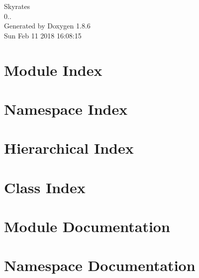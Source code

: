 \documentclass[twoside]{book}
\newcommand{\clearemptydoublepage}{%
  \newpage{\pagestyle{empty}\cleardoublepage}%
}
\begin{document}
\hypersetup{pageanchor=false}
\begin{titlepage}
\vspace*{7cm}
\begin{center}%
{\Large Skyrates \\[1ex]\large 0.. }\\
\vspace*{1cm}
{\large Generated by Doxygen 1.8.6}\\
\vspace*{0.5cm}
{\small Sun Feb 11 2018 16:08:15}\\
\end{center}
\end{titlepage}
\clearemptydoublepage
\tableofcontents
\clearemptydoublepage
{}
\hypersetup{pageanchor=true}

\chapter{Module Index}

\chapter{Namespace Index}

\chapter{Hierarchical Index}

\chapter{Class Index}

\chapter{Module Documentation}




\chapter{Namespace Documentation}





















\end{document}

